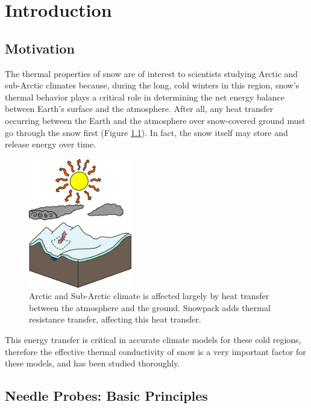 \chapter{Introduction}
\label{sec:introduction}
\bigskip

\section{Motivation}
\label{sec:introduction:motivation}

The thermal properties of snow are of interest to scientists studying Arctic and
sub-Arctic climates because, during the long, cold winters in this region,
snow's thermal behavior plays a critical role in determining the net energy
balance between Earth's surface and the atmosphere. After all, any heat transfer
occurring between the Earth and the atmosphere over snow-covered ground must go
through the snow first (Figure \ref{fig:climate}). In fact, the snow
itself may store and release energy over time.

\begin{figure}[h]
\centering
\includegraphics[width=0.4\textwidth]{fig/climate.png}
\caption{Arctic and Sub-Arctic climate is affected largely by heat transfer
between the atmosphere and the ground. Snowpack adds thermal resistance
transfer, affecting this heat transfer.}
\label{fig:climate}
\end{figure}

This energy transfer is critical in accurate climate models for these cold
regions, therefore the effective thermal conductivity of snow is a very
important factor for these models, and has been studied thoroughly. \cite{sturm1, sturm2, sturm3}


\section{Needle Probes: Basic Principles}
\label{sec:introduction:needles}


